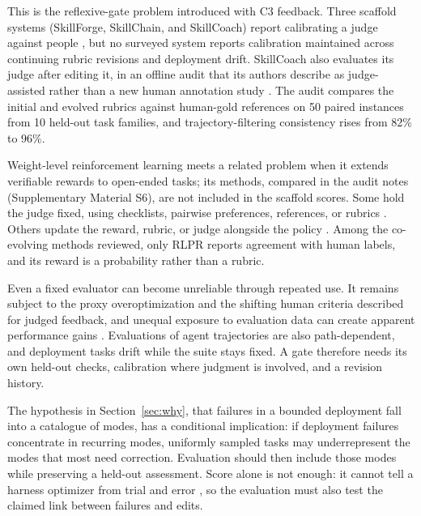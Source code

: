 This is the reflexive-gate problem introduced with C3 feedback. Three scaffold systems (SkillForge, SkillChain, and SkillCoach) report calibrating a judge against people \cite{skillforge2026, hu2026skillchain, zhu2026skillcoach}, but no surveyed system reports calibration maintained across continuing rubric revisions and deployment drift. SkillCoach also evaluates its judge after editing it, in an offline audit that its authors describe as judge-assisted rather than a new human annotation study \cite{zhu2026skillcoach}. The audit compares the initial and evolved rubrics against human-gold references on 50 paired instances from 10 held-out task families, and trajectory-filtering consistency rises from 82\% to 96\%.

Weight-level reinforcement learning meets a related problem when it extends verifiable rewards to open-ended tasks; its methods, compared in the audit notes (Supplementary Material S6), are not included in the scaffold scores. Some hold the judge fixed, using checklists, pairwise preferences, references, or rubrics \cite{gunjal2025rubrics, jia2025writingzero, shi2026references, jin2026rlaes}. Others update the reward, rubric, or judge alongside the policy \cite{yu2025rlpr, xu2026rubricarm, ding2026evorubrics, zhu2026score, li2026rubricem}. Among the co-evolving methods reviewed, only RLPR reports agreement with human labels, and its reward is a probability rather than a rubric.

Even a fixed evaluator can become unreliable through repeated use. It remains subject to the proxy overoptimization \cite{gao2023overoptimization} and the shifting human criteria \cite{shankar2024validators} described for judged feedback, and unequal exposure to evaluation data can create apparent performance gains \cite{singh2025leaderboard}. Evaluations of agent trajectories are also path-dependent, and deployment tasks drift while the suite stays fixed. A gate therefore needs its own held-out checks, calibration where judgment is involved, and a revision history.

The hypothesis in Section~\ref{sec:why}, that failures in a bounded deployment fall into a catalogue of modes, has a conditional implication: if deployment failures concentrate in recurring modes, uniformly sampled tasks may underrepresent the modes that most need correction. Evaluation should then include those modes while preserving a held-out assessment. Score alone is not enough: it cannot tell a harness optimizer from trial and error \cite{ong2026harnesseval}, so the evaluation must also test the claimed link between failures and edits.

